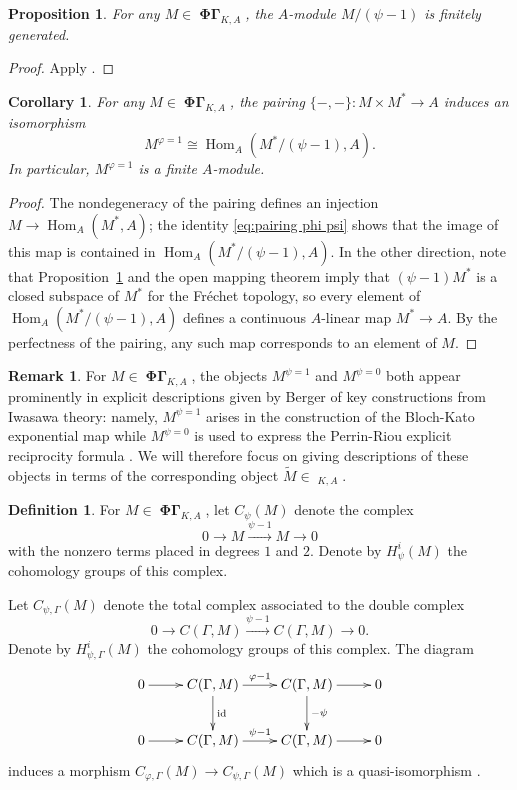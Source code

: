 \documentclass[12pt]{amsart}
\newtheorem{cor}[theorem]{Corollary}
\newtheorem{prop}[theorem]{Proposition}
\theoremstyle{definition}
\newtheorem{defn}[theorem]{Definition}
\newtheorem{remark}[theorem]{Remark}
\numberwithin{equation}{theorem}
\DeclareMathOperator{\Hom}{Hom}
\DeclareMathOperator{\id}{id}
\DeclareMathOperator{\PhiGamma}{\mathbf{\Phi \Gamma}}
\DeclareMathOperator{\PhiGammatilde}{\widetilde{\mathbf{\Phi \Gamma}}}
\begin{document}
\begin{prop} \label{P:psi finite}
For any $M \in \PhiGamma_{K,A}$,
the $A$-module $M/(\psi-1)$ is finitely generated.
\end{prop}
\begin{proof}
Apply \cite[Proposition~3.3.2(1)]{kpx}.
\end{proof}

\begin{cor}
For any $M \in \PhiGamma_{K,A}$, the pairing $\{-,-\}: M \times M^* \to A$ induces an isomorphism
\[
M^{\varphi=1} \cong \Hom_A(M^*/(\psi-1), A).
\]
In particular, $M^{\varphi=1}$ is a finite $A$-module.
\end{cor}
\begin{proof}
The nondegeneracy of the pairing defines an injection $M \to \Hom_A(M^*, A)$;
the identity \eqref{eq:pairing phi psi} shows that the image of this map is contained in
$\Hom_A(M^*/(\psi-1), A)$. In the other direction, note that Proposition~\ref{P:psi finite} and the open mapping theorem imply that $(\psi-1)M^*$ is a closed subspace of $M^*$
for the Fr\'echet topology, so every element of $\Hom_A(M^*/(\psi-1), A)$ defines a continuous $A$-linear map $M^* \to A$. By the perfectness of the pairing,
any such map corresponds to an element of $M$.
\end{proof}

\begin{remark} \label{R:berger explicit}
For $M \in \PhiGamma_{K,A}$, the objects $M^{\psi=1}$ and $M^{\psi=0}$ both appear
prominently in explicit descriptions given by Berger of key constructions from Iwasawa theory: namely, $M^{\psi=1}$ arises in the construction of the Bloch-Kato exponential map \cite[\S II.2]{berger-explicit} while $M^{\psi=0}$ is used to express the Perrin-Riou explicit reciprocity formula \cite[\S II.6]{berger-explicit}.
We will therefore focus on giving descriptions of these objects in terms of the corresponding object $\tilde{M}\in \PhiGammatilde_{K,A}$.
\end{remark}

\begin{defn} \label{D:psi cohomology}
For $M \in \PhiGamma_{K,A}$, 
let $C_\psi(M)$ denote the complex
\[
0 \to M \stackrel{\psi-1}{\to} M \to 0
\]
with the nonzero terms placed in degrees $1$ and $2$.
Denote by $H^i_{\psi}(M)$ the cohomology groups of this complex.

Let $C_{\psi, \Gamma}(M)$ denote the total complex associated to the double complex
\[
0 \to C(\Gamma, M) \stackrel{\psi-1}{\to} C(\Gamma,M) \to 0.
\]
Denote by $H^i_{\psi, \Gamma}(M)$ the cohomology groups of this complex. The diagram
\[
\xymatrix{
0 \ar[r] & C(\Gamma, M) \ar^{\varphi-1}[r] \ar^{\id}[d] & C(\Gamma,M) \ar^{-\psi}[d]\ar[r] & 0 \\
0 \ar[r] & C(\Gamma, M) \ar^{\psi-1}[r] & C(\Gamma,M) \ar[r] & 0
}
\]
induces a morphism $C_{\varphi, \Gamma}(M) \to C_{\psi, \Gamma}(M)$
which is a quasi-isomorphism \cite[Proposition~2.3.6]{kpx}.
\end{defn}
\end{document}
